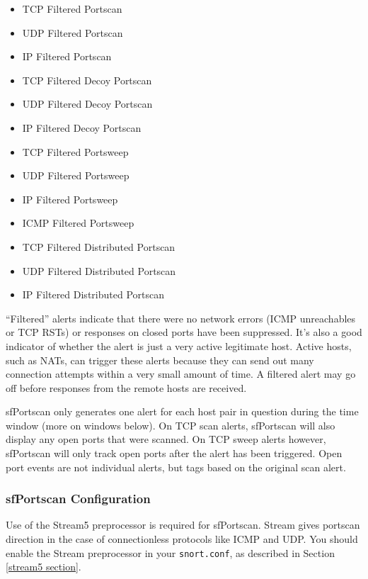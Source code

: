 \documentclass[english]{report}
\begin{document}
\begin{itemize}
\item TCP Filtered Portscan
\item UDP Filtered Portscan
\item IP Filtered Portscan

\item TCP Filtered Decoy Portscan
\item UDP Filtered Decoy Portscan
\item IP Filtered Decoy Portscan

\item TCP Filtered Portsweep
\item UDP Filtered Portsweep
\item IP Filtered Portsweep
\item ICMP Filtered Portsweep

\item TCP Filtered Distributed Portscan
\item UDP Filtered Distributed Portscan
\item IP Filtered Distributed Portscan
\end{itemize}

``Filtered'' alerts indicate that there were no network errors (ICMP
unreachables or TCP RSTs) or responses on closed ports have been suppressed.
It's also a good indicator of whether the alert is just a very active
legitimate host. Active hosts, such as NATs, can trigger these alerts because
they can send out many connection attempts within a very small amount of time.
A filtered alert may go off before responses from the remote hosts are
received.

sfPortscan only generates one alert for each host pair in question during the
time window (more on windows below). On TCP scan alerts, sfPortscan will also
display any open ports that were scanned. On TCP sweep alerts however,
sfPortscan will only track open ports after the alert has been triggered. Open
port events are not individual alerts, but tags based on the original scan
alert.

\subsubsection{sfPortscan Configuration}

Use of the Stream5 preprocessor is required for sfPortscan. Stream gives
portscan direction in the case of connectionless protocols like ICMP and UDP.
You should enable the Stream preprocessor in your \texttt{snort.conf}, as
described in Section \ref{stream5 section}.
\end{document}
